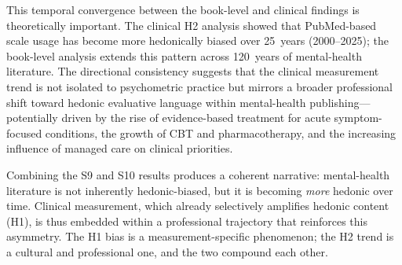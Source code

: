 \documentclass[12pt,a4paper]{article}
\begin{document}
This temporal convergence between the book-level and clinical findings is theoretically important.
The clinical H2 analysis showed that PubMed-based scale usage has become more hedonically biased over 25~years (2000--2025); the book-level analysis extends this pattern across 120~years of mental-health literature.
The directional consistency suggests that the clinical measurement trend is not isolated to psychometric practice but mirrors a broader professional shift toward hedonic evaluative language within mental-health publishing---potentially driven by the rise of evidence-based treatment for acute symptom-focused conditions, the growth of CBT and pharmacotherapy, and the increasing influence of managed care on clinical priorities.

Combining the S9 and S10 results produces a coherent narrative: mental-health literature is not inherently hedonic-biased, but it is becoming \textit{more} hedonic over time.
Clinical measurement, which already selectively amplifies hedonic content (H1), is thus embedded within a professional trajectory that reinforces this asymmetry.
The H1 bias is a measurement-specific phenomenon; the H2 trend is a cultural and professional one, and the two compound each other.
\end{document}
